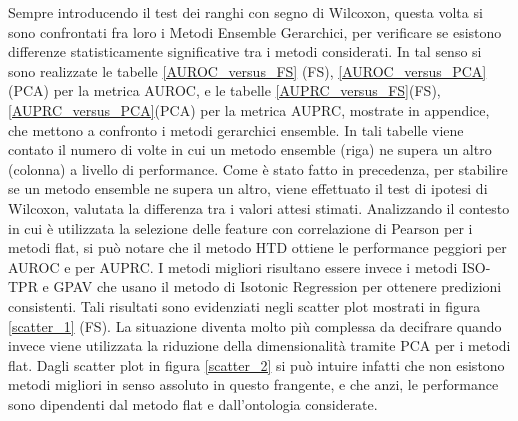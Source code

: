\documentclass[12pt]{report}
\begin{document}
Sempre introducendo il test dei ranghi con segno di Wilcoxon, questa volta si sono confrontati fra loro i Metodi Ensemble Gerarchici, per verificare se esistono differenze statisticamente significative tra i metodi considerati.
\newline
\newline
In tal senso si sono realizzate le tabelle \ref{AUROC_versus_FS} (FS), \ref{AUROC_versus_PCA}(PCA) per la metrica AUROC, e le tabelle \ref{AUPRC_versus_FS}(FS), \ref{AUPRC_versus_PCA}(PCA) per la metrica AUPRC, mostrate in appendice, che mettono a confronto i metodi gerarchici ensemble. In tali tabelle viene contato il numero di volte in cui un metodo ensemble (riga) ne supera un altro (colonna) a livello di performance. Come è stato fatto in precedenza, per stabilire se un metodo ensemble ne supera un altro, viene effettuato il test di ipotesi di Wilcoxon, valutata la differenza tra i valori attesi stimati. Analizzando il contesto in cui è utilizzata la selezione delle feature con correlazione di Pearson per i metodi flat, si può notare che  il metodo HTD ottiene le performance peggiori  per AUROC e per AUPRC. I metodi migliori risultano essere invece i metodi ISO-TPR e GPAV che usano il metodo di Isotonic Regression per ottenere predizioni consistenti. Tali risultati sono evidenziati negli scatter plot mostrati in figura
\ref{scatter_1} (FS). 
\newline
\newline
La situazione diventa molto più complessa da decifrare quando invece viene utilizzata la riduzione della dimensionalità tramite PCA per i metodi flat. Dagli scatter plot in figura \ref{scatter_2} si può intuire infatti che non esistono metodi migliori in senso assoluto in questo frangente, e che anzi, le performance sono dipendenti dal metodo flat e dall'ontologia considerate.
\end{document}
